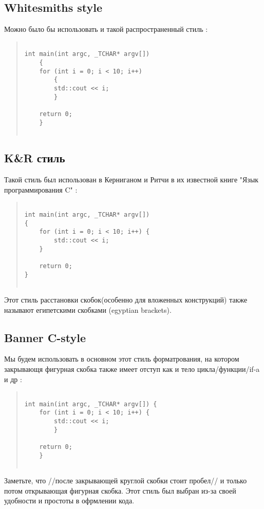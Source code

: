 \subsection{  Whitesmiths style }

Можно было бы использовать и такой распространенный стиль :
\begin{quote}
\begin{verbatim}
 
int main(int argc, _TCHAR* argv[])
    {
    for (int i = 0; i < 10; i++) 
        {
        std::cout << i;
        }
    
    return 0;
    }
 
\end{verbatim}
\end{quote}

\subsection{  K&R стиль }
Такой стиль был использован в Керниганом и Ритчи в их известной книге "Язык программирования C" :
\begin{quote}
\begin{verbatim}
 
int main(int argc, _TCHAR* argv[]) 
{
    for (int i = 0; i < 10; i++) {
        std::cout << i;
    }
    
    return 0;
}
 
\end{verbatim}
\end{quote}
Этот стиль расстановки скобок(особенно для вложенных конструкций) также называют египетскими скобками (egyptian brackets).
 
\subsection{  Banner C-style }
Мы будем использовать в основном этот стиль форматрования, на котором закрывающя фигурная скобка также имеет отступ как и тело цикла/функции/if-a и др :
\begin{quote}
\begin{verbatim}
 
int main(int argc, _TCHAR* argv[]) {
    for (int i = 0; i < 10; i++) {
        std::cout << i;
        }
    
    return 0;
    }
 
\end{verbatim}
\end{quote}
Заметьте, что //после закрывающей круглой скобки стоит пробел// и только потом открывающая фигурная скобка.
Этот стиль был выбран из-за своей удобности и простоты в офрмлении кода.

